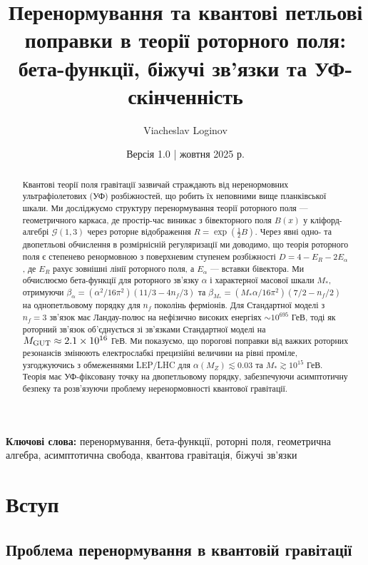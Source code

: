 \documentclass[11pt,a4paper]{article}
\title{\textbf{Перенормування та квантові петльові поправки в теорії роторного поля:\\
бета-функції, біжучі зв’язки та УФ-скінченність}}
\author[1]{Viacheslav Loginov}
\affil[1]{Kyiv, Ukraine\\ \texttt{barthez.slavik@gmail.com}}
\date{\small Версія 1.0 \quad|\quad 15 жовтня 2025 р.}
\numberwithin{equation}{section}
\theoremstyle{plain}
\theoremstyle{definition}
\theoremstyle{remark}
\newcommand{\Cl}{\mathcal{G}}               %
\begin{document}
\maketitle

\begin{abstract}
\noindent
Квантові теорії поля гравітації зазвичай страждають від неренормовних ультрафіолетових (УФ) розбіжностей, що робить їх неповними вище планківської шкали. Ми досліджуємо структуру перенормування теорії роторного поля — геометричного каркаса, де простір-час виникає з бівекторного поля $B(x)$ у кліфорд-алгебрі $\Cl(1,3)$ через роторне відображення $R=\exp(\tfrac12 B)$. Через явні одно- та двопетльові обчислення в розмірнісній регуляризації ми доводимо, що теорія роторного поля є степенево ренормовною з поверхневим ступенем розбіжності $D=4-E_R-2E_\alpha$, де $E_R$ рахує зовнішні лінії роторного поля, а $E_\alpha$ — вставки бівектора. Ми обчислюємо бета-функції для роторного зв’язку $\alpha$ і характерної масової шкали $M_*$, отримуючи $\beta_\alpha = (\alpha^2/16\pi^2)(11/3 - 4n_f/3)$ та $\beta_{M_*} = (M_* \alpha/16\pi^2)(7/2 - n_f/2)$ на однопетльовому порядку для $n_f$ поколінь ферміонів. Для Стандартної моделі з $n_f=3$ зв’язок має Ландау-полюс на нефізично високих енергіях $\sim 10^{695}$ ГеВ, тоді як роторний зв’язок об’єднується зі зв’язками Стандартної моделі на $M_{\rm GUT}\approx 2{.}1\times 10^{16}$ ГеВ. Ми показуємо, що порогові поправки від важких роторних резонансів змінюють електрослабкі прецизійні величини на рівні проміле, узгоджуючись з обмеженнями LEP/LHC для $\alpha(M_Z)\lesssim 0{.}03$ та $M_* \gtrsim 10^{15}$ ГеВ. Теорія має УФ-фіксовану точку на двопетльовому порядку, забезпечуючи асимптотичну безпеку та розв’язуючи проблему неренормовності квантової гравітації.
\end{abstract}

\noindent\textbf{Ключові слова:} перенормування, бета-функції, роторні поля, геометрична алгебра, асимптотична свобода, квантова гравітація, біжучі зв’язки

\vspace{1em}

\section{Вступ}\label{sec:intro}

\subsection{Проблема перенормування в квантовій гравітації}
\end{document}
